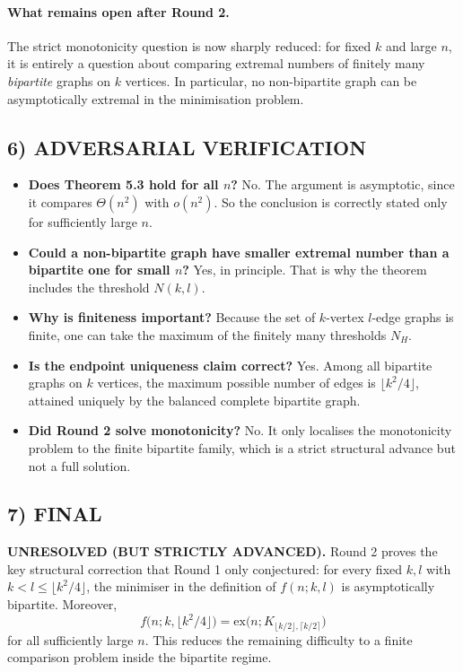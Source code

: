\paragraph{What remains open after Round 2.}
The strict monotonicity question is now sharply reduced: for fixed $k$ and large $n$, it is entirely a question about comparing extremal numbers of finitely many \emph{bipartite} graphs on $k$ vertices. In particular, no non-bipartite graph can be asymptotically extremal in the minimisation problem.

\subsection*{6) ADVERSARIAL VERIFICATION}
\begin{itemize}
\item \textbf{Does Theorem 5.3 hold for all $n$?} No. The argument is asymptotic, since it compares $\Theta(n^2)$ with $o(n^2)$. So the conclusion is correctly stated only for sufficiently large $n$.
\item \textbf{Could a non-bipartite graph have smaller extremal number than a bipartite one for small $n$?} Yes, in principle. That is why the theorem includes the threshold $N(k,l)$.
\item \textbf{Why is finiteness important?} Because the set of $k$-vertex $l$-edge graphs is finite, one can take the maximum of the finitely many thresholds $N_H$.
\item \textbf{Is the endpoint uniqueness claim correct?} Yes. Among all bipartite graphs on $k$ vertices, the maximum possible number of edges is $\lfloor k^2/4\rfloor$, attained uniquely by the balanced complete bipartite graph.
\item \textbf{Did Round 2 solve monotonicity?} No. It only localises the monotonicity problem to the finite bipartite family, which is a strict structural advance but not a full solution.
\end{itemize}

\subsection*{7) FINAL}
\textbf{UNRESOLVED (BUT STRICTLY ADVANCED).}
Round 2 proves the key structural correction that Round 1 only conjectured:
for every fixed $k,l$ with $k<l\le \lfloor k^2/4\rfloor$, the minimiser in the definition of $f(n;k,l)$ is asymptotically bipartite. Moreover,
\[
f\bigl(n;k,\lfloor k^2/4\rfloor\bigr)=\mathrm{ex}\bigl(n;K_{\lfloor k/2\rfloor,\lceil k/2\rceil}\bigr)
\]
for all sufficiently large $n$.
This reduces the remaining difficulty to a finite comparison problem inside the bipartite regime.

